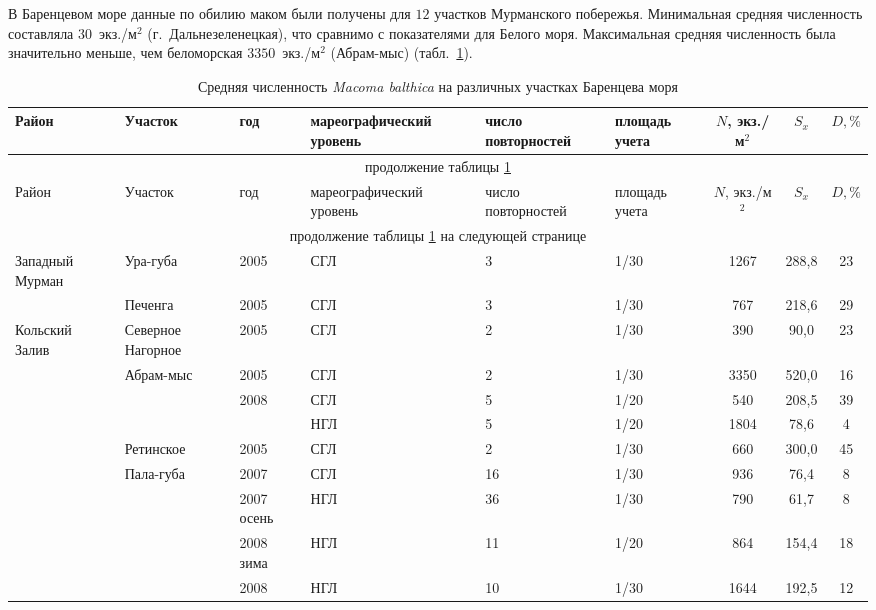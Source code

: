 \documentclass[12pt, a4paper]{disser}
\begin{document}
В Баренцевом море данные по обилию маком были получены для $12$ участков Мурманского побережья.
Минимальная средняя численность составляла $30$~экз./м$^2$ (г.~Дальнезеленецкая), что сравнимо с показателями для Белого моря. 
Максимальная средняя численность была значительно меньше, чем беломорская \textemdash $3350$~экз./м$^2$ (Абрам-мыс) (табл.~\ref{tab:mean_N_Barents}). 
	\begin{footnotesize}
	\begin{longtable}{|p{2cm}|p{3cm}|p{1cm}|p{2cm}|p{1.5cm}|p{1cm}|*{3}{c|}}
	\caption{Средняя численность {\it Macoma balthica} на различных участках Баренцева моря}\label{tab:mean_N_Barents}\\
	\hline
	Район & Участок & год & ма\-ре\-ографи\-ческий уровень & число повторностей & площадь учета & $N$, экз./м$^2$ & $S_x$  & $D, \%$ 
	\\ \hline \endfirsthead
	\hline
	\multicolumn{9}{|c|}{продолжение таблицы \ref{tab:mean_N_Barents}} \\ \hline
	Район & Участок & год & ма\-ре\-ографи\-ческий уровень & число повторностей & площадь учета & $N$, экз./м$^2$ & $S_x$  & $D, \%$ 
	\\ \hline \endhead
	\hline 
	\multicolumn{9}{|c|}{продолжение таблицы \ref{tab:mean_N_Barents} на следующей странице}
	\\ \hline \endfoot
	\endlastfoot
	Западный Мурман & Ура-губа & 2005 & СГЛ & 3 & 1/30 & 1267 & 288,8 & 23
		\\ \cline{2-9}
		 & Печенга & 2005 & СГЛ & 3 & 1/30 & 767 & 218,6 & 29
		\\ \hline
	Кольский Залив & Северное Нагорное & 2005 & СГЛ & 2 & 1/30 & 390 & 90,0 & 23
		\\ \cline{2-9}
		 & Абрам-мыс & 2005 & СГЛ & 2 & 1/30 & 3350 & 520,0 & 16
		\\ \cline{3-9}
		 &  & 2008 & СГЛ & 5 & 1/20 & 540 & 208,5 & 39
		\\ \cline{4-9}
		 &  &  & НГЛ & 5 & 1/20 & 1804 & 78,6 & 4
		\\ \cline{2-9}
		 & Ретинское & 2005 & СГЛ & 2 & 1/30 & 660 & 300,0 & 45
		\\ \cline{2-9}
		 & Пала-губа & 2007 & СГЛ & 16 & 1/30 & 936 & 76,4 & 8
		\\ \cline{3-9}
		 &  & 2007 осень & НГЛ & 36 & 1/30 & 790 & 61,7 & 8
		\\ \cline{3-9}
		 &  & 2008 зима & НГЛ & 11 & 1/20 & 864 & 154,4 & 18
		\\ \cline{3-9}
		 &  & 2008 & НГЛ & 10 & 1/30 & 1644 & 192,5 & 12

\end{longtable}
\end{footnotesize}
\end{document}
